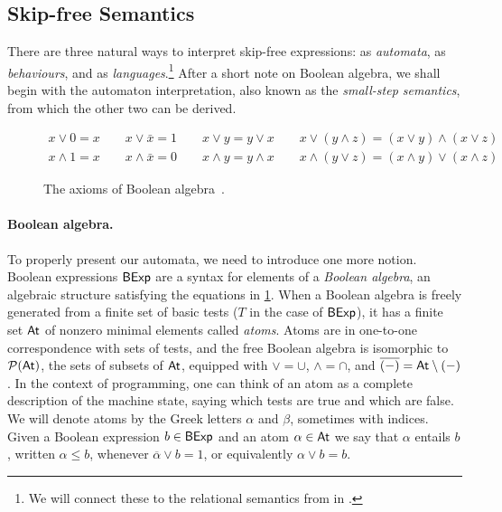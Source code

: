 \documentclass[orivec,envcountsect,envcountsame]{llncs}
\begin{document}
    \subsection{Skip-free Semantics}
    There are three natural ways to interpret skip-free \GKAT expressions: as \emph{automata}, as \emph{behaviours}, and as \emph{languages}.\footnote{We will connect these to the relational semantics from  in .}
    After a short note on Boolean algebra, we shall begin with the automaton interpretation, also known as the \emph{small-step semantics}, from which the other two can be derived.
%
    \begin{figure}[!t]
        \begin{gather*}
            x \vee 0 = x
            \qquad
            x \vee \bar x = 1
            \qquad
            x \vee y = y \vee x
            \qquad
            x\vee (y \wedge z) = (x \vee y)\wedge (x \vee z)
            \\
            x \wedge 1 = x
            \qquad
            x \wedge \bar x = 0
            \qquad
            x\wedge y = y \wedge x
            \qquad
            x\wedge (y \vee z) = (x \wedge y)\vee (x \wedge z)
        \end{gather*}
        \caption{\label{fig:boolean algebra axioms} The axioms of Boolean algebra~\cite{huntington}.}
    \end{figure}

    \paragraph{\bf Boolean algebra.}
    To properly present our automata, we need to introduce one more notion.
    Boolean expressions $\mathsf{BExp}$ are a syntax for elements of a \emph{Boolean algebra}, an algebraic structure satisfying the equations in \cref{fig:boolean algebra axioms}.
    When a Boolean algebra is freely generated from a finite set of basic tests ($T$ in the case of $\mathsf{BExp}$), it has a finite set \(\mathsf{At}\) of nonzero minimal elements called \emph{atoms}.
    Atoms are in one-to-one correspondence with sets of tests, and the free Boolean algebra is isomorphic to \(\mathcal P(\mathsf{At})\), the sets of subsets of \(\mathsf{At}\), equipped with \({\vee} = {\cup}\), \({\wedge} = {\cap}\), and \(\overline{(-)} = \mathsf{At}\setminus (-)\).
    In the context of programming, one can think of an atom as a complete description of the machine state, saying which tests are true and which are false.
    We will denote atoms by the Greek letters $\alpha$ and $\beta$, sometimes with indices.
    Given a Boolean expression $b\in \mathsf{BExp}$ and an atom $\alpha \in \mathsf{At}$ we say that $\alpha$ entails $b$, written $\alpha \leq b$, whenever $\overline\alpha \vee b = 1$, or equivalently $\alpha \vee b = b$.
%
\end{document}
